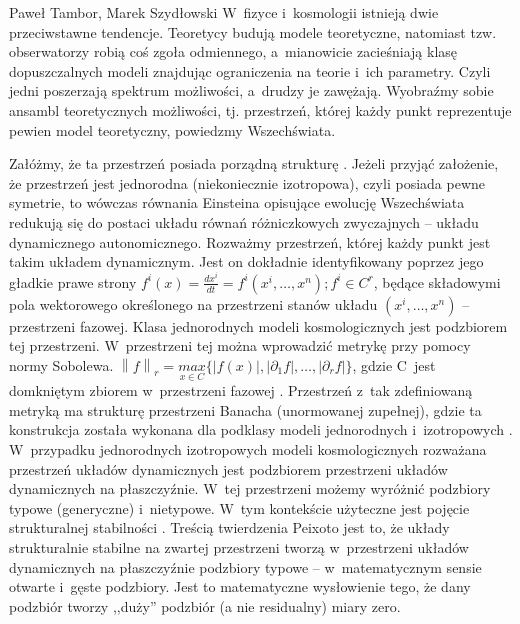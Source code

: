 \begin{artplenv2auth}{Paweł Tambor, Marek Szydłowski}
W~fizyce i~kosmologii istnieją dwie przeciwstawne tendencje. Teoretycy budują modele teoretyczne, natomiast tzw. obserwatorzy robią coś zgoła odmiennego, a~mianowicie zacieśniają klasę dopuszczalnych modeli znajdując ograniczenia na teorie i~ich parametry. Czyli jedni poszerzają spektrum możliwości, a~drudzy je zawężają. Wyobraźmy sobie ansambl teoretycznych możliwości, tj. przestrzeń, której każdy punkt reprezentuje pewien model teoretyczny, powiedzmy Wszechświata.

Załóżmy, że ta przestrzeń posiada porządną strukturę
\parencite[][]{szydlowski_metoda_1982}. %
 Jeżeli przyjąć założenie, że przestrzeń jest jednorodna (niekoniecznie izotropowa), czyli posiada pewne symetrie, to wówczas równania Einsteina opisujące ewolucję Wszechświata redukują się do postaci układu równań różniczkowych zwyczajnych -- układu dynamicznego autonomicznego. Rozważmy przestrzeń, której każdy punkt jest takim układem dynamicznym. Jest on dokładnie identyfikowany poprzez jego gładkie prawe strony $f^i\left(x\right)=\frac{\mathit{dx}^i}{\mathit{dt}}=f^i\left(x^i,{\dots},x^n\right);f^i{\in}C^r$, będące składowymi pola wektorowego określonego na przestrzeni stanów układu $\left(x^i,{\dots},x^n\right)$ -- przestrzeni fazowej. Klasa jednorodnych modeli kosmologicznych jest podzbiorem tej przestrzeni. W~przestrzeni tej można wprowadzić metrykę przy pomocy normy Sobolewa. $\left\|f\right\|_r=\underset{x{\in}C}{\mathit{max}}\{\left|f\left(x\right)\right|,\left|{\partial}_1f\right|,{\dots},\left|{\partial}_rf\right|\}$, gdzie C~jest domkniętym zbiorem w~przestrzeni fazowej 
\parencite[][]{perko_differential_1996}. %
 Przestrzeń z~tak zdefiniowaną metryką ma strukturę przestrzeni Banacha (unormowanej zupełnej), gdzie ta konstrukcja została wykonana dla podklasy modeli jednorodnych i~izotropowych 
\parencites[][]{szydlowski_towards_2007}[por.][]{szydlowski_cosmological_2007}. %
 W~przypadku jednorodnych izotropowych modeli kosmologicznych rozważana przestrzeń układów dynamicznych jest podzbiorem przestrzeni układów dynamicznych na płaszczyźnie. W~tej przestrzeni możemy wyróżnić podzbiory typowe (generyczne) i~nietypowe. W~tym kontekście użyteczne jest pojęcie strukturalnej stabilności 
\parencite[][]{tambor_czy_2017}. %
 Treścią twierdzenia Peixoto jest to, że układy strukturalnie stabilne na zwartej przestrzeni tworzą w~przestrzeni układów dynamicznych na płaszczyźnie podzbiory typowe -- w~matematycznym sensie otwarte i~gęste podzbiory. Jest to matematyczne wysłowienie tego, że dany podzbiór tworzy ,,duży'' podzbiór (a nie residualny) miary zero.
 

\end{artplenv2auth}
